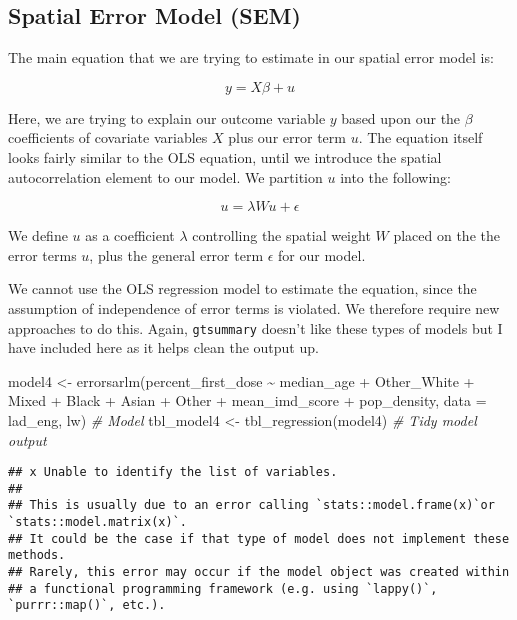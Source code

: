 \documentclass[
]{book}
\newenvironment{Shaded}{\begin{snugshade}}{\end{snugshade}}
\newcommand{\AttributeTok}[1]{\textcolor[rgb]{0.77,0.63,0.00}{#1}}
\newcommand{\CommentTok}[1]{\textcolor[rgb]{0.56,0.35,0.01}{\textit{#1}}}
\newcommand{\FunctionTok}[1]{\textcolor[rgb]{0.00,0.00,0.00}{#1}}
\newcommand{\NormalTok}[1]{#1}
\newcommand{\OtherTok}[1]{\textcolor[rgb]{0.56,0.35,0.01}{#1}}
\newcommand{\SpecialCharTok}[1]{\textcolor[rgb]{0.00,0.00,0.00}{#1}}
\begin{document}
\hypertarget{spatial-error-model-sem}{%
\subsection{Spatial Error Model (SEM)}\label{spatial-error-model-sem}}

The main equation that we are trying to estimate in our spatial error model is:

\[
y = X\beta + u
\]

Here, we are trying to explain our outcome variable \(y\) based upon our the \(\beta\) coefficients of covariate variables \(X\) plus our error term \(u\). The equation itself looks fairly similar to the OLS equation, until we introduce the spatial autocorrelation element to our model. We partition \(u\) into the following:

\[
u = \lambda Wu + \epsilon
\]

We define \(u\) as a coefficient \(\lambda\) controlling the spatial weight \(W\) placed on the the error terms \(u\), plus the general error term \(\epsilon\) for our model.

We cannot use the OLS regression model to estimate the equation, since the assumption of independence of error terms is violated. We therefore require new approaches to do this. Again, \texttt{gtsummary} doesn't like these types of models but I have included here as it helps clean the output up.

\begin{Shaded}
\begin{Highlighting}[]
\NormalTok{model4 }\OtherTok{\textless{}{-}} \FunctionTok{errorsarlm}\NormalTok{(percent\_first\_dose }\SpecialCharTok{\textasciitilde{}}\NormalTok{ median\_age }\SpecialCharTok{+}\NormalTok{ Other\_White }\SpecialCharTok{+}\NormalTok{ Mixed }\SpecialCharTok{+}\NormalTok{ Black }\SpecialCharTok{+}\NormalTok{ Asian }\SpecialCharTok{+}\NormalTok{ Other }\SpecialCharTok{+}\NormalTok{ mean\_imd\_score }\SpecialCharTok{+}\NormalTok{ pop\_density, }\AttributeTok{data =}\NormalTok{ lad\_eng, lw) }\CommentTok{\# Model}
\NormalTok{tbl\_model4 }\OtherTok{\textless{}{-}} \FunctionTok{tbl\_regression}\NormalTok{(model4) }\CommentTok{\# Tidy model output}
\end{Highlighting}
\end{Shaded}

\begin{verbatim}
## x Unable to identify the list of variables.
## 
## This is usually due to an error calling `stats::model.frame(x)`or `stats::model.matrix(x)`.
## It could be the case if that type of model does not implement these methods.
## Rarely, this error may occur if the model object was created within
## a functional programming framework (e.g. using `lappy()`, `purrr::map()`, etc.).
\end{verbatim}
\end{document}

